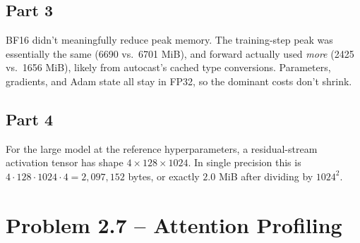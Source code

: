 \documentclass[11pt]{article}
\begin{document}
\subsection*{Part 3}

BF16 didn't meaningfully reduce peak memory. The training-step peak was essentially the same (6690 vs.\ 6701 MiB), and forward actually used \emph{more} (2425 vs.\ 1656 MiB), likely from autocast's cached type conversions. Parameters, gradients, and Adam state all stay in FP32, so the dominant costs don't shrink.

\subsection*{Part 4}

For the large model at the reference hyperparameters, a residual-stream activation
tensor has shape $4 \times 128 \times 1024$. In single precision this is
$4 \cdot 128 \cdot 1024 \cdot 4 = 2{,}097{,}152$ bytes, or exactly $2.0$ MiB
after dividing by $1024^2$.


\section{Problem 2.7 -- Attention Profiling}
\end{document}
